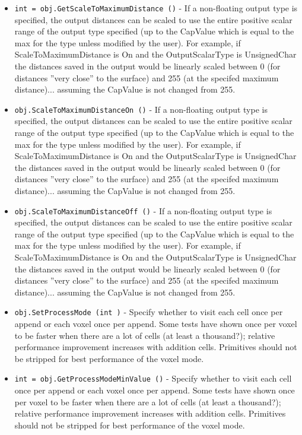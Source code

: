 \begin{itemize}
\item  \verb|int = obj.GetScaleToMaximumDistance ()| -  If a non-floating output type is specified, the output distances can be
 scaled to use the entire positive scalar range of the output type 
 specified (up to the CapValue which is equal to the max for the type 
 unless modified by the user).  For example, if ScaleToMaximumDistance
 is On and the OutputScalarType is UnsignedChar the distances saved in the
 output would be linearly scaled between 0 (for distances ''very close'' to
 the surface) and 255 (at the specifed maximum distance)... assuming the 
 CapValue is not changed from 255.

\item  \verb|obj.ScaleToMaximumDistanceOn ()| -  If a non-floating output type is specified, the output distances can be
 scaled to use the entire positive scalar range of the output type 
 specified (up to the CapValue which is equal to the max for the type 
 unless modified by the user).  For example, if ScaleToMaximumDistance
 is On and the OutputScalarType is UnsignedChar the distances saved in the
 output would be linearly scaled between 0 (for distances ''very close'' to
 the surface) and 255 (at the specifed maximum distance)... assuming the 
 CapValue is not changed from 255.

\item  \verb|obj.ScaleToMaximumDistanceOff ()| -  If a non-floating output type is specified, the output distances can be
 scaled to use the entire positive scalar range of the output type 
 specified (up to the CapValue which is equal to the max for the type 
 unless modified by the user).  For example, if ScaleToMaximumDistance
 is On and the OutputScalarType is UnsignedChar the distances saved in the
 output would be linearly scaled between 0 (for distances ''very close'' to
 the surface) and 255 (at the specifed maximum distance)... assuming the 
 CapValue is not changed from 255.

\item  \verb|obj.SetProcessMode (int )| -  Specify whether to visit each cell once per append or each voxel once
 per append.  Some tests have shown once per voxel to be faster
 when there are a lot of cells (at least a thousand?); relative
 performance improvement increases with addition cells.  Primitives
 should not be stripped for best performance of the voxel mode.  

\item  \verb|int = obj.GetProcessModeMinValue ()| -  Specify whether to visit each cell once per append or each voxel once
 per append.  Some tests have shown once per voxel to be faster
 when there are a lot of cells (at least a thousand?); relative
 performance improvement increases with addition cells.  Primitives
 should not be stripped for best performance of the voxel mode.  


\end{itemize}

